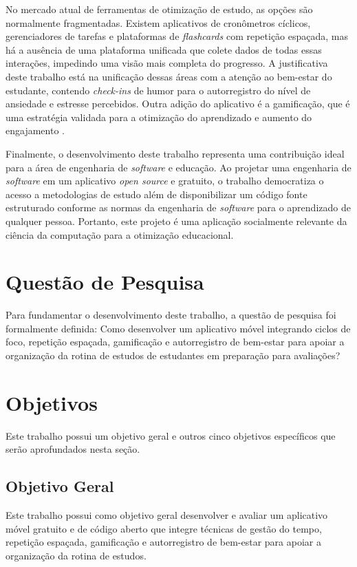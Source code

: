 No mercado atual de ferramentas de otimização de estudo, as opções são normalmente fragmentadas.
Existem aplicativos de cronômetros cíclicos, gerenciadores de tarefas e plataformas de \textit{flashcards} com repetição espaçada, mas há a ausência de uma plataforma unificada que colete dados de todas essas interações, impedindo uma visão mais completa do progresso.
A justificativa deste trabalho está na unificação dessas áreas com a atenção ao bem-estar do estudante, contendo \textit{check-ins} de humor para o autorregistro do nível de ansiedade e estresse percebidos.
Outra adição do aplicativo é a gamificação, que é uma estratégia validada para a otimização do aprendizado e aumento do engajamento \cite{marengo_2025}.

Finalmente, o desenvolvimento deste trabalho representa uma contribuição ideal para a área de engenharia de \textit{software} e educação.
Ao projetar uma engenharia de \textit{software} em um aplicativo \textit{open source} e gratuito, o trabalho democratiza o acesso a metodologias de estudo além de disponibilizar um código fonte estruturado conforme as normas da engenharia de \textit{software} para o aprendizado de qualquer pessoa.
Portanto, este projeto é uma aplicação socialmente relevante da ciência da computação para a otimização educacional.

\section{Questão de Pesquisa}

Para fundamentar o desenvolvimento deste trabalho, a questão de pesquisa foi formalmente definida: Como desenvolver um aplicativo móvel integrando ciclos de foco, repetição espaçada, gamificação e autorregistro de bem-estar para apoiar a organização da rotina de estudos de estudantes em preparação para avaliações?

\section{Objetivos}

Este trabalho possui um objetivo geral e outros cinco objetivos específicos que serão aprofundados nesta seção.

\subsection{Objetivo Geral}

Este trabalho possui como objetivo geral desenvolver e avaliar um aplicativo móvel gratuito e de código aberto que integre técnicas de gestão do tempo, repetição espaçada, gamificação e autorregistro de bem-estar para apoiar a organização da rotina de estudos.

